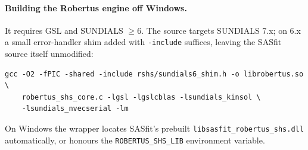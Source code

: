 \documentclass[11pt,a4paper]{article}
\newcommand{\code}[1]{\texttt{#1}}
\begin{document}
\paragraph{Building the Robertus engine off Windows.} It requires GSL and
SUNDIALS $\ge6$. The source targets SUNDIALS 7.x; on 6.x a small
error-handler shim added with \code{-include} suffices, leaving the SASfit
source itself unmodified:
\begin{verbatim}
gcc -O2 -fPIC -shared -include rshs/sundials6_shim.h -o librobertus.so \
    robertus_shs_core.c -lgsl -lgslcblas -lsundials_kinsol \
    -lsundials_nvecserial -lm
\end{verbatim}
On Windows the wrapper locates SASfit's prebuilt
\code{libsasfit\_robertus\_shs.dll} automatically, or honours the
\code{ROBERTUS\_SHS\_LIB} environment variable.
\end{document}
